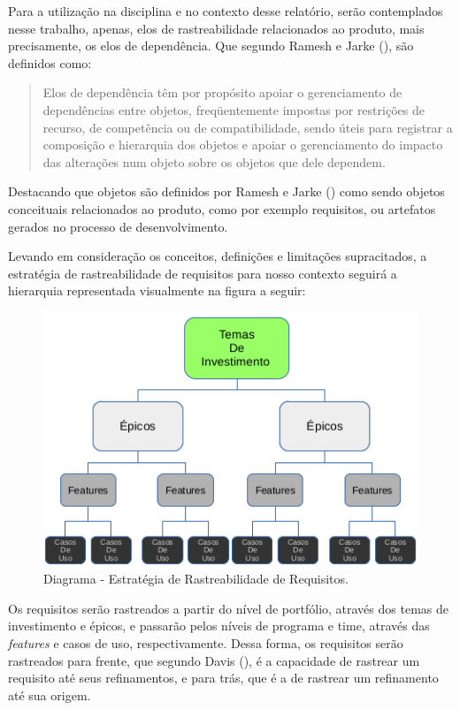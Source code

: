     Para a utilização na disciplina e no contexto desse relatório, 
    serão contemplados nesse trabalho, apenas, elos de rastreabilidade relacionados ao produto, 
    mais precisamente, os elos de dependência. Que segundo Ramesh e Jarke (\citeyear{ramesh01}), são definidos como:

    \begin{quote}
      Elos de dependência têm por propósito apoiar o gerenciamento de dependências entre objetos, 
      freqüentemente impostas por restrições de recurso, de competência ou de compatibilidade, 
      sendo úteis para registrar a composição e hierarquia dos objetos e apoiar o gerenciamento do impacto das 
      alterações num objeto sobre os objetos que dele dependem. \cite{ramesh01}
    \end{quote}
  
    Destacando que objetos são definidos por Ramesh e Jarke (\citeyear{ramesh01}) como sendo objetos conceituais 
    relacionados ao produto, como por exemplo requisitos, ou artefatos gerados no processo de desenvolvimento.

    Levando em consideração os  conceitos, definições e limitações supracitados, a estratégia de rastreabilidade de 
    requisitos para nosso contexto seguirá a hierarquia representada visualmente na figura a seguir:
  
    \begin{figure}[!htbp]
      \centering
      \includegraphics[scale=0.7]{editaveis/figuras/traceability}
      \caption[Diagrama - Estratégia de Rastreabilidade de Requisitos.] {Diagrama - Estratégia de Rastreabilidade de Requisitos. \footnotemark}
      \label{traceability}
    \end{figure}
 
    Os requisitos serão rastreados a partir do nível de portfólio, 
    através dos temas de investimento e épicos, e passarão pelos níveis de programa e time, 
    através das \textit{features} e casos de uso, respectivamente. Dessa forma, os requisitos serão rastreados para frente, 
    que segundo Davis (\citeyear{davis93}), é a capacidade de rastrear um requisito até seus refinamentos, 
    e para trás, que é a de rastrear um refinamento até sua origem.
  
